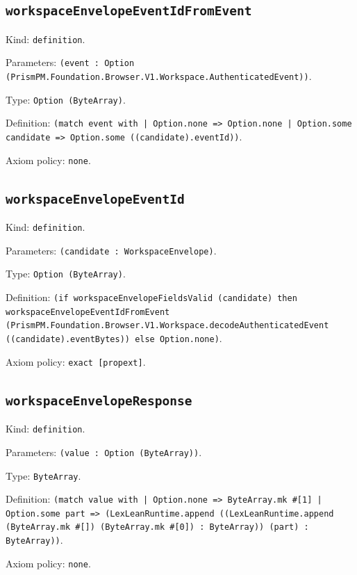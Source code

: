 \documentclass[11pt]{article}
\begin{document}
\subsection*{\texttt{workspaceEnvelopeEventIdFromEvent}}
\noindent Kind: \texttt{definition}.\par
\noindent Parameters: \texttt{(event : Option (PrismPM.Foundation.Browser.V1.Workspace.AuthenticatedEvent))}.\par
\noindent Type: \texttt{Option (ByteArray)}.\par
\noindent Definition: \texttt{(match event with | Option.none => Option.none | Option.some candidate => Option.some ((candidate).eventId))}.\par
\noindent Axiom policy: \texttt{none}.\par
\subsection*{\texttt{workspaceEnvelopeEventId}}
\noindent Kind: \texttt{definition}.\par
\noindent Parameters: \texttt{(candidate : WorkspaceEnvelope)}.\par
\noindent Type: \texttt{Option (ByteArray)}.\par
\noindent Definition: \texttt{(if workspaceEnvelopeFieldsValid (candidate) then workspaceEnvelopeEventIdFromEvent (PrismPM.Foundation.Browser.V1.Workspace.decodeAuthenticatedEvent ((candidate).eventBytes)) else Option.none)}.\par
\noindent Axiom policy: \texttt{exact [propext]}.\par
\subsection*{\texttt{workspaceEnvelopeResponse}}
\noindent Kind: \texttt{definition}.\par
\noindent Parameters: \texttt{(value : Option (ByteArray))}.\par
\noindent Type: \texttt{ByteArray}.\par
\noindent Definition: \texttt{(match value with | Option.none => ByteArray.mk \#[1] | Option.some part => (LexLeanRuntime.append ((LexLeanRuntime.append (ByteArray.mk \#[]) (ByteArray.mk \#[0]) : ByteArray)) (part) : ByteArray))}.\par
\noindent Axiom policy: \texttt{none}.\par
\end{document}
